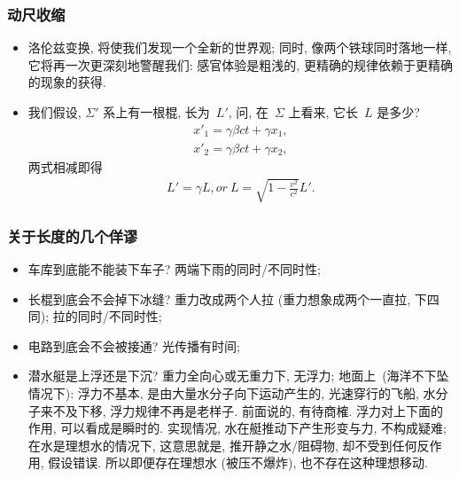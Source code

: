 \documentclass[aspectratio=169, 10pt, utf8, mathserif]{beamer}
\def\hilite<#1>{\temporal<#1>{\color{blue!80}}{\color{blue!85!white}}{\color{black}}}%
\numberwithin{equation}{section} %
\numberwithin{figure}{section} %
\begin{document}
\begin{frame}
\frametitle{\textsc{动尺收缩}}
\begin{itemize}

\hilite<1>\item 洛伦兹变换, 将使我们发现一个全新的世界观; 同时, 像两个铁球同时落地一样, 它将再一次更深刻地警醒我们: 感官体验是粗浅的, 更精确的规律依赖于更精确的现象的获得.\pause

\hilite<2>\item 我们假设, $\Sigma'$ 系上有一根棍, 长为~$L'$, 问, 在~$\Sigma$ 上看来, 它长~$L$ 是多少?
\begin{align}
x'_1=\gamma\beta ct+\gamma x_1,\\
x'_2=\gamma\beta ct+\gamma x_2,
\end{align}
两式相减即得
\begin{align}
L'=\gamma L, or~L=\sqrt{1-\frac{v^2}{c^2}}L'.\nonumber
\end{align}

\end{itemize}

\end{frame}

\begin{frame}
\frametitle{\textsc{关于长度的几个佯谬}}
\begin{itemize}

\hilite<1>\item 车库到底能不能装下车子? 两端下雨的同时/不同时性;\pause 

\hilite<2>\item 长棍到底会不会掉下冰缝? 重力改成两个人拉 (重力想象成两个一直拉, 下四同); 拉的同时/不同时性;\pause

\hilite<3>\item 电路到底会不会被接通? 光传播有时间;\pause
\hilite<4>\item 潜水艇是上浮还是下沉? 重力全向心或无重力下, 无浮力; 地面上~(海洋不下坠情况下): 浮力不基本, 是由大量水分子向下运动产生的, 光速穿行的飞船, 水分子来不及下移, 浮力规律不再是老样子. 前面说的, 有待商榷. 浮力对上下面的作用, 可以看成是瞬时的. 实现情况, 水在艇推动下产生形变与力, 不构成疑难; 在水是理想水的情况下, 这意思就是, 推开静之水/阻碍物, 却不受到任何反作用, 假设错误. 所以即便存在理想水 (被压不爆炸), 也不存在这种理想移动.
\end{itemize}

\end{frame}

\end{document}
